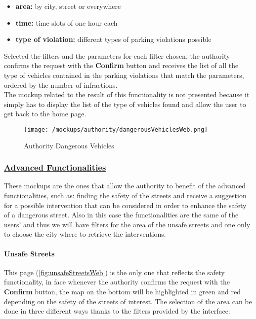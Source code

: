 				\begin{itemize}
					\item \textbf{area:} by city, street or everywhere
					\item \textbf{time:} time slots of one hour each
					\item \textbf{type of violation:} different types of parking violations possible
				\end{itemize}
			
				Selected the filters and the parameters for each filter chosen, the authority confirms the request with the \textbf{Confirm} button and receives the list of all the type of vehicles contained in the parking violations that match the parameters, ordered by the number of infractions.\\
				
				The mockup related to the result of this functionality is not presented because it simply has to display the list of the type of vehicles found and allow the user to get back to the home page.
				
				 \vspace{0.6cm}
				
				\begin{figure}[ht!]
					\centering
					\texttt{[image: /mockups/authority/dangerousVehiclesWeb.png]}
					\caption{\label{fig:dangerousVehiclesWeb} Authority Dangerous Vehicles}
				\end{figure}
			
			\subsubsection[Advanced Functionalities]{\hyperlink{toc}{Advanced Functionalities}}
				\label{sec:authorityAdvancedFunctioalites}
				
				These mockups are the ones that allow the authority to benefit of the advanced functionalities, such as: finding the safety of the streets and receive a suggestion for a possible intervention that can be considered in order to enhance the safety of a dangerous street. Also in this case the functionalities are the same of the users' and thus we will have filters for the area of the unsafe streets and one only to choose the city where to retrieve the interventions.
				
				\paragraph{Unsafe Streets}
				This page (\autoref{fig:unsafeStreetsWeb}) is the only one that reflects the safety functionality, in face whenever the authority confirms the request with the \textbf{Confirm} button, the map on the bottom will be highlighted in green and red depending on the safety of the streets of interest. The selection of the area can be done in three different ways thanks to the filters provided by the interface:
				
